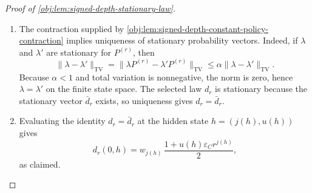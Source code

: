 \begin{proof}[Proof of \cref{obj:lem:signed-depth-stationary-law}]
\begin{enumerate}
\item The contraction supplied by \cref{obj:lem:signed-depth-constant-policy-contraction}
implies uniqueness of stationary probability vectors. Indeed, if \(\lambda\) and
\(\lambda'\) are stationary for \(P^{(r)}\), then
\[
\|\lambda-\lambda'\|_{\mathrm{TV}}
=
\|\lambda P^{(r)}-\lambda'P^{(r)}\|_{\mathrm{TV}}
\le
\alpha\|\lambda-\lambda'\|_{\mathrm{TV}}.
\]
Because \(\alpha<1\) and total variation is nonnegative, the norm is zero, hence
\(\lambda=\lambda'\) on the finite state space. The selected law \(d_r\) is
stationary because the stationary vector \(\bar d_r\) exists, so uniqueness gives
\(d_r=\bar d_r\). %

\item Evaluating the identity \(d_r=\bar d_r\) at the hidden state
\(h=(j(h),u(h))\) gives
\[
d_r(0,h)
=
w_{j(h)}\,\frac{1+u(h)\varepsilon_C r^{j(h)}}{2},
\]
as claimed. %
\end{enumerate}
\end{proof}
